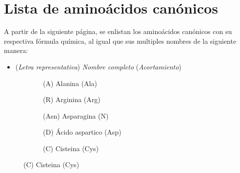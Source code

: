 \section{Lista de aminoácidos canónicos}\label{sec:aminoácidos_canónicos}

A partir de la siguiente página, se enlistan los aminoácidos canónicos con su respectiva fórmula química, al igual que sus multiples nombres de la siguiente manera:

\begin{itemize}
    \item (\textit{Letra representativa}) \textit{Nombre completo} (\textit{Acortamiento})
\end{itemize}

\begin{figure}[H]
\centering

    \begin{subfigure}{0.9\textwidth}
        \centering
        \caption{(A) Alanina (Ala)}
        \label{fig:alanina}
    \end{subfigure}
    
    \vspace{0.75cm}
    
    \begin{subfigure}{0.9\textwidth}
        \centering
        \caption{(R) Arginina (Arg)}
        \label{fig:arginina}
    \end{subfigure}
    
    \vspace{0.75cm}
    
    \begin{subfigure}{0.9\textwidth}
        \centering
        \caption{(Asn) Asparagina (N)}
        \label{fig:asparagina}
    \end{subfigure}
    
    \vspace{0.75cm}
    
    \begin{subfigure}{0.9\textwidth}
        \centering
        \caption{(D) Ácido aspartico (Asp)}
        \label{fig:ácido_aspártico}
    \end{subfigure}
    
    \vspace{0.75cm}
    
    \begin{subfigure}{0.9\textwidth}
        \centering
        \caption{(C) Cisteina (Cys)}
        \label{fig:cisteina}
    \end{subfigure}
    
\end{figure}

